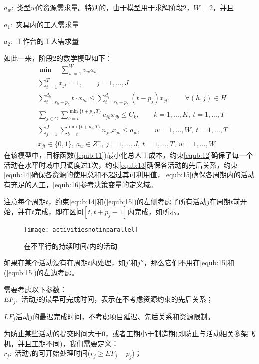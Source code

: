 $a_w:$ 类型$w$的资源需求量。特别的，由于模型用于求解阶段2，$W=2$，并且
\begin{center}
$a_1:$ 夹具内的工人需求量

$a_2:$ 工作台的工人需求量
\end{center}
如此一来，阶段2的数学模型如下：
\begin{align}
&\label{equb:11} \min \quad \sum_{w=1}^W v_wa_w\\
&\label{equb:12} \sum_{t=1}^T x_{jt} = 1,\qquad j = 1,...,J\\
&\label{equb:13} \sum_{t = r_h + p_h}^{d_h}t\cdot x_{ht}\leqslant \sum_{t = r_h + p_h}^{d_j}(t - p_j)x_{jt},\qquad \forall (h,j) \in H\\
&\label{equb:14} \sum_{j\in G}\sum_{b=t}^{\min\{t + p_j,T\}}c_{jk}x_{jb} \leqslant C_k,\qquad k = 1,...,K,\ t = 1,...,T\\
&\label{equb:15} \sum_{j=1}^J\sum_{b=t}^{\min\{t + p_j,T\}}n_{jw}x_{jb} \leqslant a_w,\qquad w = 1,...,W,\ t = 1,...,T\\
&\label{equb:16} x_{jt}\in \{0,1\},\ a_w\in Z^+,\ j = 1,...,J,\ t = 1,...,T,\ w = 1,...,W
\end{align}
在该模型中，目标函数(\ref{equb:11})最小化总人工成本，约束\eqref{equb:12}确保了每一个活动在水平时域中只调度过1次，约束\eqref{equb:13}确保各活动的先后关系，约束\eqref{equb:14}确保各资源的使用总和不超过其可利用值，\eqref{equb:15}确保各周期内的活动有充足的人工，\eqref{equb:16}参考决策变量的定义域。

注意每个周期$t$，约束\eqref{equb:14}和(\ref{equb:15})的左侧考虑了所有活动$j$在周期$t$前开始，并在$t$完成，即在区间$[t,t+p_j-1]$内完成，如所示。
\begin{figure}[h]
\centering\caption{在不平行的持续时间$t$内的活动\label{fig:notinparallelt}}
\texttt{[image: activitiesnotinparallel]}
\end{figure}
如果在某个活动没有在周期$t$内处理，如$j'$和$j''$，那么它们不用在\eqref{equb:15}和(\ref{equb:15})的左边考虑。

需要考虑以下参数：\\[3pt]
\indent $EF_j:$ 活动$j$的最早可完成时间，表示在不考虑资源约束的先后关系；

$LF_j$活动$j$的最迟完成时间，不考虑项目延迟、先后关系和资源限制。

为防止某些活动的提交时间大于0，或者工期小于制造期(即防止与活动相关多架飞机，并且工期不同)，我们需要定义：\\[3pt]
\indent $r_j:$ 活动$j$的可开始处理时间($r_j\geqslant EF_j - p_j$)；

